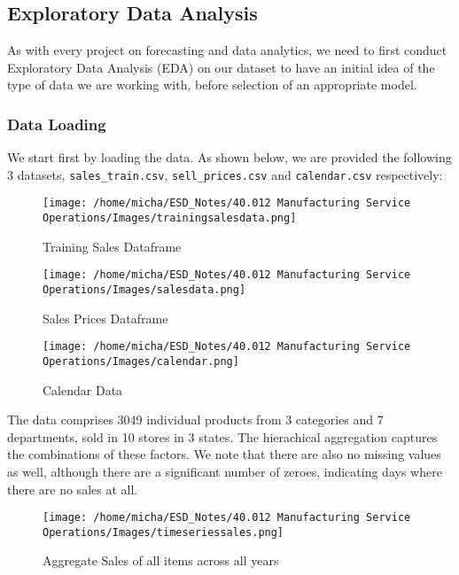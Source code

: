 \documentclass[12pt]{article}
\begin{document}
\subsection*{Exploratory Data Analysis}

As with every project on forecasting and data analytics, we need to first conduct Exploratory Data Analysis (EDA) on our dataset to have an initial idea of the type of data we are working with, before selection of an appropriate model. 

\subsubsection*{Data Loading}

We start first by loading the data. As shown below, we are provided the following 3 datasets, \verb|sales_train.csv|, \verb|sell_prices.csv| and \verb|calendar.csv| respectively: 

\begin{figure}[H]
    \centering
    \texttt{[image: /home/micha/ESD\_Notes/40.012 Manufacturing Service Operations/Images/trainingsalesdata.png]}
    \caption{Training Sales Dataframe}
    \label{fig:6-trainingsales}
\end{figure} 

\begin{figure}[H]
    \centering
    \texttt{[image: /home/micha/ESD\_Notes/40.012 Manufacturing Service Operations/Images/salesdata.png]}
    \caption{Sales Prices Dataframe}
    \label{fig:6-salesdata}
\end{figure} 

\begin{figure}[H]
    \centering
    \texttt{[image: /home/micha/ESD\_Notes/40.012 Manufacturing Service Operations/Images/calendar.png]}
    \caption{Calendar Data}
    \label{fig:6-calendardata}
\end{figure} 

\noindent The data comprises 3049 individual products from 3 categories and 7 departments, sold in 10 stores in 3 states. The hierachical aggregation captures the combinations of these factors. We note that there are also no missing values as well, although there are a significant number of zeroes, indicating days where there are no sales at all. 

\begin{figure}[H]
    \centering
    \texttt{[image: /home/micha/ESD\_Notes/40.012 Manufacturing Service Operations/Images/timeseriessales.png]}
    \caption{Aggregate Sales of all items across all years}
    \label{fig:aggregatesales}
\end{figure} 
\end{document}

